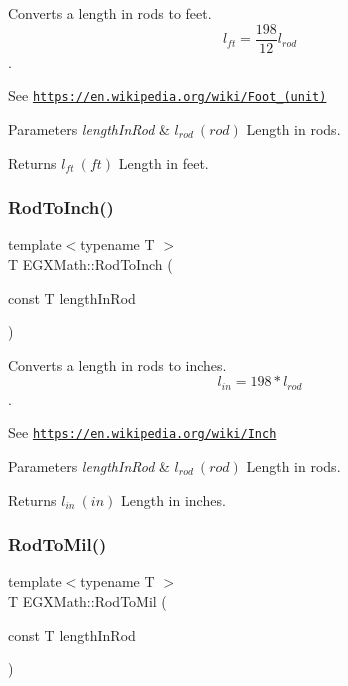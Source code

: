 Converts a length in rods to feet. \[ l_{ft}= \frac{198}{12} l_{rod} \]. 

See \href{https://en.wikipedia.org/wiki/Foot_(unit)}{\tt https\+://en.\+wikipedia.\+org/wiki/\+Foot\+\_\+(unit)} 
\begin{DoxyParams}{Parameters}
{\em length\+In\+Rod} & $ l_{rod}\ (rod)$ Length in rods. \\
\hline
\end{DoxyParams}
\begin{DoxyReturn}{Returns}
$ l_{ft}\ (ft)$ Length in feet. 
\end{DoxyReturn}
\mbox{\label{group___e_g_x_math-_conversions-_length_conversions-_imperial-_rod-_imperial_gaa49be09f9d06ac2d8a5e0c3079a8ce5d}} 
\subsubsection{\texorpdfstring{Rod\+To\+Inch()}{RodToInch()}}
{\footnotesize\ttfamily template$<$typename T $>$ \\
T E\+G\+X\+Math\+::\+Rod\+To\+Inch (\begin{DoxyParamCaption}\item[{const T}]{length\+In\+Rod }\end{DoxyParamCaption})}



Converts a length in rods to inches. \[ l_{in}= 198 * l_{rod} \]. 

See \href{https://en.wikipedia.org/wiki/Inch}{\tt https\+://en.\+wikipedia.\+org/wiki/\+Inch} 
\begin{DoxyParams}{Parameters}
{\em length\+In\+Rod} & $ l_{rod}\ (rod)$ Length in rods. \\
\hline
\end{DoxyParams}
\begin{DoxyReturn}{Returns}
$ l_{in}\ (in)$ Length in inches. 
\end{DoxyReturn}
\mbox{\label{group___e_g_x_math-_conversions-_length_conversions-_imperial-_rod-_imperial_ga8458f45f5b02b4127d0d5626422b17c3}} 
\subsubsection{\texorpdfstring{Rod\+To\+Mil()}{RodToMil()}}
{\footnotesize\ttfamily template$<$typename T $>$ \\
T E\+G\+X\+Math\+::\+Rod\+To\+Mil (\begin{DoxyParamCaption}\item[{const T}]{length\+In\+Rod }\end{DoxyParamCaption})}




